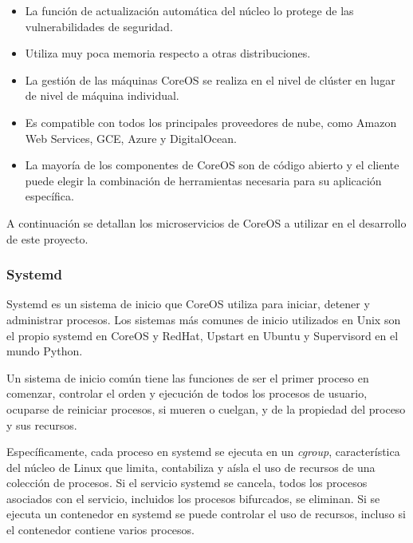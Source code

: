 \begin{itemize}
\item La función de actualización automática del núcleo lo protege de las vulnerabilidades de seguridad.
\item Utiliza muy poca memoria respecto a otras distribuciones.
\item La gestión de las máquinas CoreOS se realiza en el nivel de clúster en lugar de nivel de máquina individual.
\item Es compatible con todos los principales proveedores de nube, como Amazon Web Services, GCE, Azure y DigitalOcean.
\item La mayoría de los componentes de CoreOS son de código abierto y el cliente puede elegir la combinación de herramientas necesaria para su aplicación específica.
\end{itemize}

A continuación se detallan los microservicios de CoreOS a utilizar en el desarrollo de este proyecto.

\subsubsection{Systemd}

Systemd es un sistema de inicio que CoreOS utiliza para iniciar, detener y administrar procesos. Los sistemas más comunes de inicio utilizados en Unix son el propio systemd en CoreOS y RedHat, Upstart en Ubuntu y Supervisord en el mundo Python.

Un sistema de inicio común tiene las funciones de ser el primer proceso en comenzar, controlar el orden y ejecución de todos los procesos de usuario, ocuparse de reiniciar procesos, si mueren o cuelgan, y de la propiedad del proceso y sus recursos.

Específicamente, cada proceso en systemd se ejecuta en un \textit{cgroup}, característica del núcleo de Linux que limita, contabiliza y aísla el uso de recursos de una colección de procesos. Si el servicio systemd se cancela, todos los procesos asociados con el servicio, incluidos los procesos bifurcados, se eliminan. Si se ejecuta un contenedor en systemd se puede controlar el uso de recursos, incluso si el contenedor contiene varios procesos.
 
